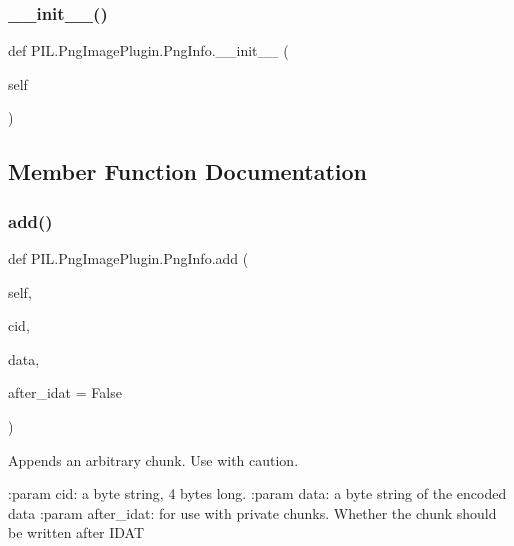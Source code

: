 \subsubsection{\texorpdfstring{\+\_\+\+\_\+init\+\_\+\+\_\+()}{\_\_init\_\_()}}
{\footnotesize\ttfamily def P\+I\+L.\+Png\+Image\+Plugin.\+Png\+Info.\+\_\+\+\_\+init\+\_\+\+\_\+ (\begin{DoxyParamCaption}\item[{}]{self }\end{DoxyParamCaption})}



\subsection{Member Function Documentation}
\mbox{\label{classPIL_1_1PngImagePlugin_1_1PngInfo_a5d41090193bc5aeda95950f47604f6f0}} 
\subsubsection{\texorpdfstring{add()}{add()}}
{\footnotesize\ttfamily def P\+I\+L.\+Png\+Image\+Plugin.\+Png\+Info.\+add (\begin{DoxyParamCaption}\item[{}]{self,  }\item[{}]{cid,  }\item[{}]{data,  }\item[{}]{after\+\_\+idat = {\ttfamily False} }\end{DoxyParamCaption})}

\begin{DoxyVerb}Appends an arbitrary chunk. Use with caution.

:param cid: a byte string, 4 bytes long.
:param data: a byte string of the encoded data
:param after_idat: for use with private chunks. Whether the chunk
           should be written after IDAT\end{DoxyVerb}
 \mbox{\label{classPIL_1_1PngImagePlugin_1_1PngInfo_a724fac3ae7f458e8ad79e3e21139c1cd}} 
